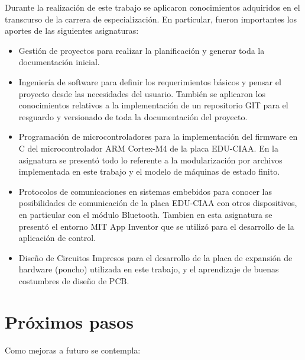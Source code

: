 Durante la realización de este trabajo se aplicaron conocimientos adquiridos en el transcurso de la carrera de especialización. 
En particular, fueron importantes los aportes de las siguientes  asignaturas:


\begin{itemize}
	\item Gestión de proyectos para realizar la planificación y generar toda la documentación inicial.
	\item Ingeniería de software para definir los requerimientos básicos y pensar el proyecto desde las necesidades del usuario. También se aplicaron los conocimientos relativos a la implementación de un repositorio GIT para el resguardo y versionado de toda la documentación del proyecto.
	\item Programación de microcontroladores para la implementación del firmware en C del microcontrolador ARM Cortex-M4 de la placa EDU-CIAA. En la asignatura se presentó todo lo referente a la modularización por archivos implementada en este trabajo y el modelo de máquinas de estado finito.
	\item Protocolos de comunicaciones en sistemas embebidos para conocer las posibilidades de comunicación de la placa EDU-CIAA con otros dispositivos, en particular con el módulo Bluetooth. Tambien en esta asignatura se presentó el entorno MIT App Inventor que se utilizó para el desarrollo de la aplicación de control.
	\item Diseño de Circuitos Impresos para el desarrollo de la placa de expansión de hardware (poncho) utilizada en este trabajo, y el aprendizaje de buenas costumbres de diseño de PCB.
			
\end{itemize}

\section{Próximos pasos}

Como mejoras a futuro se contempla:

